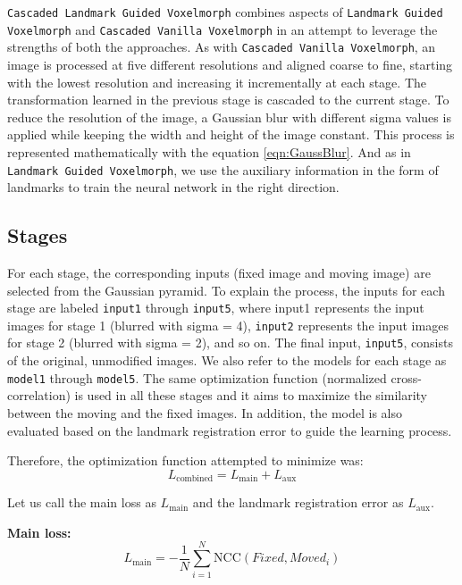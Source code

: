 \documentclass{book}
\begin{document}
	\texttt{Cascaded Landmark Guided Voxelmorph} combines aspects of \texttt{Landmark Guided Voxelmorph} and \texttt{Cascaded Vanilla Voxelmorph} in an attempt to leverage the strengths of both the approaches. As with \texttt{Cascaded Vanilla Voxelmorph}, an image is processed at five different resolutions and aligned coarse to fine, starting with the lowest resolution and increasing it incrementally at each stage. The transformation learned in the previous stage is cascaded to the current stage. To reduce the resolution of the image, a Gaussian blur with different sigma values is applied while keeping the width and height of the image constant. This process is represented mathematically with the equation \ref{eqn:GaussBlur}. And as in \texttt{Landmark Guided Voxelmorph}, we use the auxiliary information in the form of landmarks to train the neural network in the right direction.
	
	\subsection{Stages}
	For each stage, the corresponding inputs (fixed image and moving image) are selected from the Gaussian pyramid. To explain the process, the inputs for each stage are labeled \texttt{input1} through \texttt{input5}, where input1 represents the input images for stage 1 (blurred with sigma = 4), \texttt{input2} represents the input images for stage 2 (blurred with sigma = 2), and so on. The final input, \texttt{input5}, consists of the original, unmodified images. We also refer to the models for each stage as \texttt{model1} through \texttt{model5}. The same optimization function (normalized cross-correlation) is used in all these stages and it aims to maximize the similarity between the moving and the fixed images. In addition, the model is also evaluated based on the landmark registration error to guide the learning process.
	
	Therefore, the optimization function attempted to minimize was:
	\begin{equation}\label{eq:aux_loss_combined}
		L_\text{combined} = L_\text{main} + L_\text{aux}
	\end{equation}
	
	Let us call the main loss as $L_\text{main}$ and the landmark registration error as $L_\text{aux}$.
	
	\textbf{Main loss:}
	\begin{equation}\label{eq:aux_loss_main}
		L_\text{main} = -\frac{1}{N} \sum_{i=1}^N \text{NCC}(Fixed, Moved_i)
	\end{equation}
	
\end{document}
